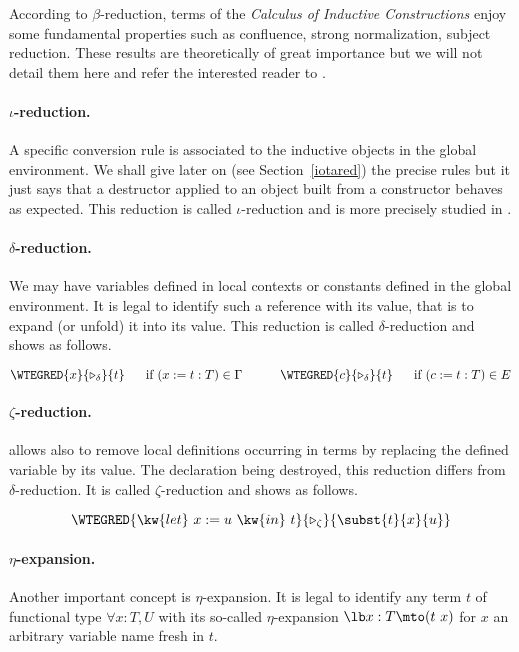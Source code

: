 According to $\beta$-reduction, terms of the {\em Calculus of
  Inductive Constructions} enjoy some fundamental properties such as
confluence, strong normalization, subject reduction. These results are
theoretically of great importance but we will not detail them here and
refer the interested reader to \cite{Coq85}.

\paragraph[$\iota$-reduction.]{$\iota$-reduction.\label{iota}}
A specific conversion rule is associated to the inductive objects in
the global environment.  We shall give later on (see Section~\ref{iotared}) the
precise rules but it just says that a destructor applied to an object
built from a constructor behaves as expected.  This reduction is
called $\iota$-reduction and is more precisely studied in
\cite{Moh93,Wer94}.


\paragraph[$\delta$-reduction.]{$\delta$-reduction.\label{delta}}

We may have variables defined in local contexts or constants defined in the global
environment. It is legal to identify such a reference with its value,
that is to expand (or unfold) it into its value. This
reduction is called $\delta$-reduction and shows as follows.

$$\WTEGRED{x}{\triangleright_{\delta}}{t}~~~~~\mbox{if $(x:=t:T) \in \Gamma$}~~~~~~~~~\WTEGRED{c}{\triangleright_{\delta}}{t}~~~~~\mbox{if $(c:=t:T) \in E$}$$


\paragraph[$\zeta$-reduction.]{$\zeta$-reduction.\label{zeta}}

{\Coq} allows also to remove local definitions occurring in terms by
replacing the defined variable by its value. The declaration being
destroyed, this reduction differs from $\delta$-reduction. It is
called $\zeta$-reduction and shows as follows.

$$\WTEGRED{\kw{let}~x:=u~\kw{in}~t}{\triangleright_{\zeta}}{\subst{t}{x}{u}}$$

\paragraph{$\eta$-expansion.%
\label{eta}%
%
}%
Another important concept is $\eta$-expansion. It is legal to identify any
term $t$ of functional type $\forall x:T, U$ with its so-called
$\eta$-expansion $\lb x:T\mto (t\ x)$ for $x$ an arbitrary variable
name fresh in $t$.

